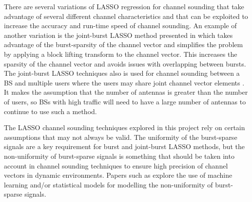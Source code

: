 There are several variations of LASSO regression for channel sounding that take advantage of several different channel characteristics and that can be exploited to increase the accuracy and run-time speed of channel sounding. An example of another variation is the joint-burst LASSO method presented in \cite{Liu2016} which takes advantage of the burst-sparsity of the channel vector and simplifies the problem by applying a block lifting transform to the channel vector. This increases the sparsity of the channel vector and avoids issues with overlapping between bursts. The joint-burst LASSO techniques also is used for channel sounding between a BS and multiple users where the users may share joint channel vector elements \cite{Liu2016}. It makes the assumption that the number of antennas is greater than the number of users, so BSs with high traffic will need to have a large number of antennas to continue to use such a method.

The LASSO channel sounding techniques explored in this project rely on certain assumptions that may not always be valid. The uniformity of the burst-sparse signals are a key requirement for burst and joint-burst LASSO methods, but the non-uniformity of burst-sparse signals is something that should be taken into account in channel sounding techniques to ensure high precision of channel vectors in dynamic environments. Papers such as \cite{Dai2019} explore the use of machine learning and/or statistical models for modelling the non-uniformity of burst-sparse signals.